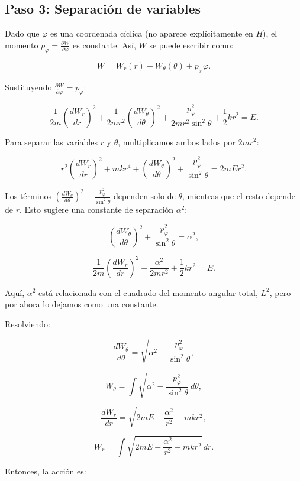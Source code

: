 \documentclass[12pt]{article}
\begin{document}
\begin{enumerate}
  \subsection*{Paso 3: Separación de variables}

  Dado que \( \varphi \) es una coordenada cíclica (no aparece explícitamente en \( H \)), el momento \( p_\varphi = \frac{\partial W}{\partial \varphi} \) es constante. Así, \( W \) se puede escribir como:

  \[
  W = W_r(r) + W_\theta(\theta) + p_\varphi \varphi.
  \]

  Sustituyendo \( \frac{\partial W}{\partial \varphi} = p_\varphi \):

  \[
  \frac{1}{2m} \left( \frac{d W_r}{dr} \right)^2 + \frac{1}{2m r^2} \left( \frac{d W_\theta}{d \theta} \right)^2 + \frac{p_\varphi^2}{2m r^2 \sin^2 \theta} + \frac{1}{2} k r^2 = E.
  \]

  Para separar las variables \( r \) y \( \theta \), multiplicamos ambos lados por \( 2m r^2 \):

  \[
  r^2 \left( \frac{d W_r}{dr} \right)^2 + m k r^4 + \left( \frac{d W_\theta}{d \theta} \right)^2 + \frac{p_\varphi^2}{\sin^2 \theta} = 2m E r^2.
  \]

  Los términos \( \left( \frac{d W_\theta}{d \theta} \right)^2 + \frac{p_\varphi^2}{\sin^2 \theta} \) dependen solo de \( \theta \), mientras que el resto depende de \( r \). Esto sugiere una constante de separación \( \alpha^2 \):

  \[
  \left( \frac{d W_\theta}{d \theta} \right)^2 + \frac{p_\varphi^2}{\sin^2 \theta} = \alpha^2,
  \]

  \[
  \frac{1}{2m} \left( \frac{d W_r}{dr} \right)^2 + \frac{\alpha^2}{2m r^2} + \frac{1}{2} k r^2 = E.
  \]

  Aquí, \( \alpha^2 \) está relacionada con el cuadrado del momento angular total, \( L^2 \), pero por ahora lo dejamos como una constante.

  Resolviendo:

  \[
  \frac{d W_\theta}{d \theta} = \sqrt{ \alpha^2 - \frac{p_\varphi^2}{\sin^2 \theta} },
  \]

  \[
  W_\theta = \int \sqrt{ \alpha^2 - \frac{p_\varphi^2}{\sin^2 \theta} } \, d\theta,
  \]

  \[
  \frac{d W_r}{dr} = \sqrt{ 2m E - \frac{\alpha^2}{r^2} - m k r^2 },
  \]

  \[
  W_r = \int \sqrt{ 2m E - \frac{\alpha^2}{r^2} - m k r^2 } \, dr.
  \]

  Entonces, la acción es:


\end{enumerate}
\end{document}
